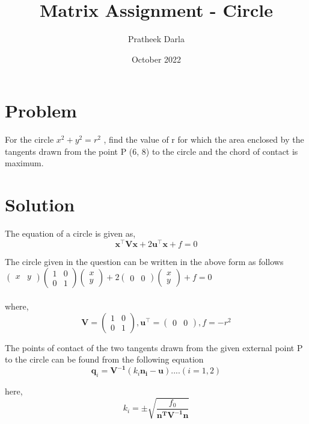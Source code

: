 \documentclass[journal,10.75pt,twocolumn]{IEEEtran}
\title{\mytitle}
\title{
Matrix Assignment - Circle
}
\author{Pratheek Darla}
\date{October 2022}
\newcommand{\myvec}[1]{\ensuremath{\begin{pmatrix}#1\end{pmatrix}}}
\let\vec\mathbf
\begin{document}
\maketitle
\tableofcontents
\bigskip


\section{\textbf{Problem}}
For the circle $x^2+y^2= r^2$ , find the value of r for which the
area enclosed by the tangents drawn from the point P (6, 8)
to the circle and the chord of contact is maximum.\\


\section{\textbf{Solution}}
The equation of a circle is given as,   \\

\begin{equation}
{\vec{x^{\top}V x} + 2\vec{u^{\top}x}} + f=0 \label{eq-1}
\end{equation}

The circle given in the question can be written in the above form as follows
\\

$\myvec{x & y}\myvec{1&0\\ 0&1}\myvec{x\\y} + 2\myvec{0&0}\myvec{x\\y} + f = 0$\\
\\
where,
\\
\begin{equation}
\vec{V}=\myvec{1&0\\ 0&1} , \vec{u^{\top}}=\myvec{0&0} , f=-r^2 \label{eq-2}
\end{equation}


The points of contact of the two tangents drawn from the given external point P to the circle can be found from the following equation
\\
\begin{equation}
\boxed{\vec{q}_i = \vec{V^{-1}}(k_i\vec{n_i-u})}  ....(i = 1,2) \label{eq-3}
\end{equation}

here,
\\
\begin{equation}
k_i = \pm\sqrt{\frac{f_0} {\vec{n^T} \vec{V^{-1}} \vec{n}}} \label{eq-4}
\end{equation}
\end{document}

